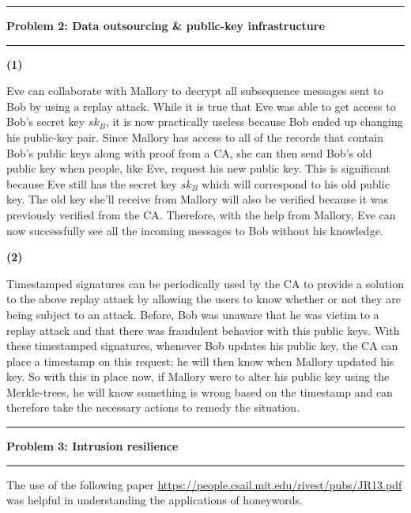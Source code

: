 \documentclass[11pt]{article}
\newcommand\question[2]{\vspace{.25in}\hrule\textbf{#1: #2}\vspace{.5em}\hrule\vspace{.10in}}
\renewcommand\part[1]{\vspace{.10in}\textbf{(#1)}\par}
\begin{document}
\question{Problem 2}{Data outsourcing \& public-key infrastructure}
	\part{1}
		Eve can collaborate with Mallory to decrypt all subsequence messages sent to Bob by using a replay attack. While it is true that Eve was able to get access to Bob's secret key $sk_B$, it is now practically useless because Bob ended up changing his public-key pair. Since Mallory has access to all of the records that contain Bob's public keys along with proof from a CA, she can then send Bob's old public key when people, like Eve, request his new public key. This is significant because Eve still has the secret key $sk_B$ which will correspond to his old public key. The old key she'll receive from Mallory will also be verified because it was previously verified from the CA. Therefore, with the help from Mallory, Eve can now successfully see all the incoming messages to Bob without his knowledge.

	\part{2}
		Timestamped signatures can be periodically used by the CA to provide a solution to the above replay attack by allowing the users to know whether or not they are being subject to an attack. Before, Bob was unaware that he was victim to a replay attack and that there was fraudulent behavior with this public keys. With these timestamped signatures, whenever Bob updates his public key, the CA can place a timestamp on this request; he will then know when Mallory updated his key. So with this in place now, if Mallory were to alter his public key using the Merkle-trees, he will know something is wrong based on the timestamp and can therefore take the necessary actions to remedy the situation. 


\question{Problem 3}{Intrusion resilience}
	The use of the following paper \url{https://people.csail.mit.edu/rivest/pubs/JR13.pdf} was helpful in understanding the applications of honeywords.
\end{document}
